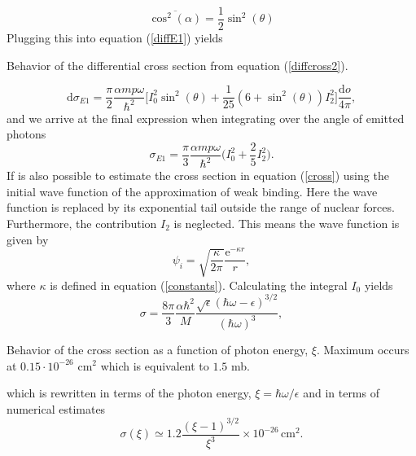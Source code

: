 \begin{equation} 
    \overline{\cos^2(\alpha)} = \frac{1}{2}\sin^2(\theta)
\end{equation}
Plugging this into equation (\ref{diffE1}) yields
\begin{marginfigure}
\centering
{}
\caption{Behavior of the differential cross section from equation (\ref{diffcross2}).}
\end{marginfigure}
\begin{equation} \label{diffcross2}
    \textrm{d}\sigma_{E1} = \frac{\pi}{2}\frac{\alpha m p \omega}{\hbar^2} \Big[I_0^2 \sin^2(\theta)+\frac{1}{25}(6+\sin^2(\theta))I_2^2 \Big] \frac{\textrm{d}o}{4\pi},
\end{equation}
and we arrive at the final expression when integrating over the angle of emitted photons
\begin{equation} \label{cross}
    \sigma_{E1} = \frac{\pi}{3}\frac{\alpha m p \omega}{\hbar^2} \Big( I_0^2+\frac{2}{5}I_2^2\Big).
\end{equation}
If is also possible to estimate the cross section in equation (\ref{cross}) using the initial wave function of the approximation of weak binding. Here the wave function is replaced by its exponential tail outside the range of nuclear forces. Furthermore, the contribution $I_2$ is neglected. This means the wave function is given by
\begin{equation}
    \psi_i = \sqrt{\frac{\kappa}{2\pi}} \frac{\textrm{e}^{-\kappa r}}{r},
\end{equation}
where $\kappa$ is defined in equation (\ref{constants}). Calculating the integral $I_0$ yields
\begin{equation}
    \sigma = \frac{8\pi}{3} \frac{\alpha\hbar^2}{M}\frac{\sqrt{\epsilon}(\hbar\omega-\epsilon)^{3/2}}{(\hbar\omega)^3},
\end{equation}
\begin{marginfigure}

\caption{Behavior of the cross section as a function of photon energy, $\xi$. Maximum occurs at $0.15\cdot10^{-26}$ cm$^2$ which is equivalent to $1.5$ mb. }
\end{marginfigure}

which is rewritten in terms of the photon energy, $\xi = \hbar \omega/\epsilon$ and in terms of numerical estimates
\begin{equation}
    \sigma(\xi) \simeq  1.2\frac{(\xi-1)^{3/2}}{\xi^3}\times 10^{-26} \, \textrm{cm}^2.
\end{equation}